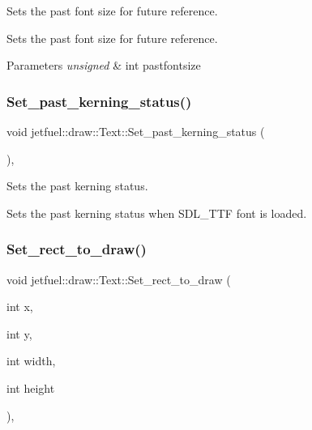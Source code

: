 Sets the past font size for future reference. 

Sets the past font size for future reference.


\begin{DoxyParams}{Parameters}
{\em unsigned} & int pastfontsize \\
\hline
\end{DoxyParams}
\mbox{\label{classjetfuel_1_1draw_1_1Text_a98b604584ef64a98b148add202334c8b}} 
\subsubsection{\texorpdfstring{Set\+\_\+past\+\_\+kerning\+\_\+status()}{Set\_past\_kerning\_status()}}
{\footnotesize\ttfamily void jetfuel\+::draw\+::\+Text\+::\+Set\+\_\+past\+\_\+kerning\+\_\+status (\begin{DoxyParamCaption}{ }\end{DoxyParamCaption})\hspace{0.3cm}{\ttfamily [inline]}, {\ttfamily [protected]}}



Sets the past kerning status. 

Sets the past kerning status when S\+D\+L\+\_\+\+T\+TF font is loaded. \mbox{\label{classjetfuel_1_1draw_1_1Text_a7d4b482620c679410eee2687288f3992}} 
\subsubsection{\texorpdfstring{Set\+\_\+rect\+\_\+to\+\_\+draw()}{Set\_rect\_to\_draw()}}
{\footnotesize\ttfamily void jetfuel\+::draw\+::\+Text\+::\+Set\+\_\+rect\+\_\+to\+\_\+draw (\begin{DoxyParamCaption}\item[{int}]{x,  }\item[{int}]{y,  }\item[{int}]{width,  }\item[{int}]{height }\end{DoxyParamCaption})\hspace{0.3cm}{\ttfamily [inline]}, {\ttfamily [protected]}}



